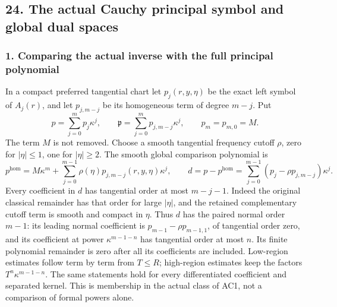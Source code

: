 \documentclass[
  11pt,
]{article}
\makeatletter
\let\ReaderOriginalAnchorStart\hyper@anchorstart
\let\ReaderOriginalAnchorEnd\hyper@anchorend
\let\ReaderPendingAliases\@empty
\def\ReaderArmAliases#1{\gdef\ReaderPendingAliases{#1}}
\def\hyper@anchorstart#1{\ReaderIfNativeAnchorTF{#1}{\ReaderPendingAliases\global\let\ReaderPendingAliases\@empty}{}\ReaderOriginalAnchorStart{#1}}
\makeatother
\begin{document}
\ReaderArmAliases{\ReaderOriginalAnchorStart{AN03-GCF-FOUNDATION-024}\ReaderOriginalAnchorEnd\begingroup\expandafter\def\csname @currentHref\endcsname{AN03-GCF-FOUNDATION-024}\label{AN03-GCF-FOUNDATION-024}\endgroup\ReaderOriginalAnchorStart{boundary-foundation-24}\ReaderOriginalAnchorEnd}
\subsection{24. The actual Cauchy principal symbol and global dual
spaces}\label{boundary-foundation-24}

\ReaderArmAliases{\ReaderOriginalAnchorStart{AN03-GCF-FOUNDATION-026}\ReaderOriginalAnchorEnd\begingroup\expandafter\def\csname @currentHref\endcsname{AN03-GCF-FOUNDATION-026}\label{AN03-GCF-FOUNDATION-026}\endgroup\ReaderOriginalAnchorStart{pc-inverse-comparison}\ReaderOriginalAnchorEnd}
\subsubsection{1. Comparing the actual inverse with the full principal
polynomial}\label{pc-inverse-comparison}

In a compact preferred tangential chart let \(p_j(r,y,\eta)\) be the
exact left symbol of \(A_j(r)\), and let \(p_{j,m-j}\) be its
homogeneous term of degree \(m-j\). Put \[
 p=\sum_{j=0}^m p_j\kappa^j,
 \qquad \mathfrak p=\sum_{j=0}^m p_{j,m-j}\kappa^j,
 \qquad p_m=p_{m,0}=M.
 \tag{PC1}
\] The term \(M\) is not removed. Choose a smooth tangential frequency
cutoff \(\rho\), zero for \(|\eta|\leq1\), one for \(|\eta|\geq2\). The
smooth global comparison polynomial is \[
 p^{\mathrm{hom}}=M\kappa^m+
       \sum_{j=0}^{m-1}\rho(\eta)p_{j,m-j}(r,y,\eta)\kappa^j,
 \qquad
 d=p-p^{\mathrm{hom}}
       =\sum_{j=0}^{m-1}(p_j-\rho p_{j,m-j})\kappa^j.
 \tag{PC2}
\] Every coefficient in \(d\) has tangential order at most \(m-j-1\).
Indeed the original classical remainder has that order for large
\(|\eta|\), and the retained complementary cutoff term is smooth and
compact in \(\eta\). Thus \(d\) has the paired normal order \(m-1\): its
leading normal coefficient is \(p_{m-1}-\rho p_{m-1,1}\), of tangential
order zero, and its coefficient at power \(\kappa^{m-1-n}\) has
tangential order at most \(n\). Its finite polynomial remainder is zero
after all its coefficients are included. Low-region estimates follow
term by term from \(T\leq R\); high-region estimates keep the factors
\(T^n\kappa^{m-1-n}\). The same statements hold for every differentiated
coefficient and separated kernel. This is membership in the actual class
of AC1, not a comparison of formal powers alone.
\end{document}
